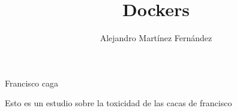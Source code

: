 \documentclass[]{article}
\title{Dockers}
\author{Alejandro Martínez Fernández}
\begin{document}
	
\begin{titlepage}
	\maketitle
	Francisco caga
\end{titlepage}
\oddsidemargin=-0.75cm
Esto es un estudio sobre la toxicidad de las cacas de francisco
\section{}
\end{document}
